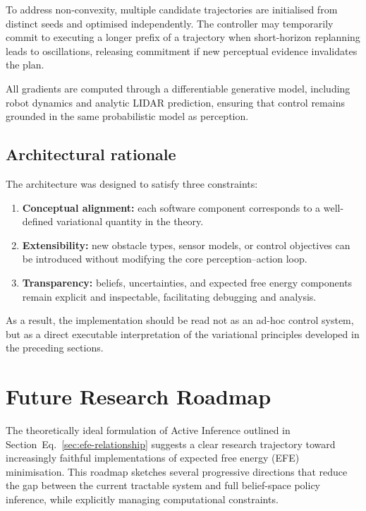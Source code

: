 \documentclass[a4paper, twoside]{article}
\begin{document}
To address non-convexity, multiple candidate trajectories are initialised from distinct seeds and optimised
independently. The controller may temporarily commit to executing a longer prefix of a trajectory when
short-horizon replanning leads to oscillations, releasing commitment if new perceptual evidence invalidates
the plan.

All gradients are computed through a differentiable generative model, including robot dynamics and analytic
LIDAR prediction, ensuring that control remains grounded in the same probabilistic model as perception.

\subsection{Architectural rationale}

The architecture was designed to satisfy three constraints:

\begin{enumerate}
    \item \textbf{Conceptual alignment:} each software component corresponds to a well-defined variational
    quantity in the theory.
    
    \item \textbf{Extensibility:} new obstacle types, sensor models, or control objectives can be introduced
    without modifying the core perception--action loop.
    
    \item \textbf{Transparency:} beliefs, uncertainties, and expected free energy components remain explicit
    and inspectable, facilitating debugging and analysis.
\end{enumerate}

As a result, the implementation should be read not as an ad-hoc control system, but as a direct executable
interpretation of the variational principles developed in the preceding sections.


\section{Future Research Roadmap}

The theoretically ideal formulation of Active Inference outlined in Section~Eq.~\ref{sec:efe-relationship} 
suggests a clear research trajectory toward increasingly faithful implementations of expected free 
energy (EFE) minimisation. This roadmap sketches several progressive directions that reduce the gap 
between the current tractable system and full belief-space policy inference, while explicitly 
managing computational constraints.
\end{document}
